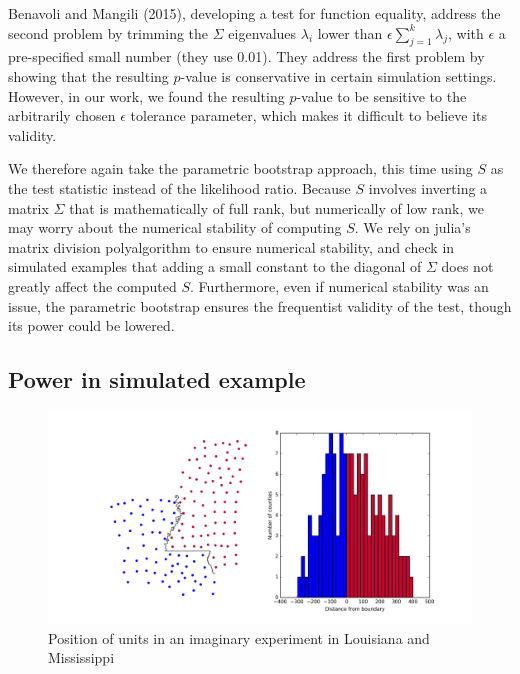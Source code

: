 \documentclass[letter]{article}
\makeatletter
\def\maxwidth{\ifdim\Gin@nat@width>\linewidth\linewidth
\else\Gin@nat@width\fi}
\let\Oldincludegraphics\includegraphics
\renewcommand{\includegraphics}[1]{\Oldincludegraphics[width=.8\maxwidth]{#1}}
\makeatother
\begin{document}
Benavoli and Mangili (2015), developing a test for function equality, address the second problem by trimming the \(\Sigma\) eigenvalues \(\lambda_i\) lower than \(\epsilon \sum_{j=1}^k \lambda_j\), with \(\epsilon\) a pre-specified small number (they use 0.01).
They address the first problem by showing that the resulting \(p\)-value is conservative in certain simulation settings.
However, in our work, we found the resulting \(p\)-value to be sensitive to the arbitrarily chosen \(\epsilon\) tolerance parameter, which makes it difficult to believe its validity.

We therefore again take the parametric bootstrap approach, this time using \(S\) as the test statistic instead of the likelihood ratio.
Because \(S\) involves inverting a matrix \(\Sigma\) that is mathematically of full rank, but numerically of low rank, we may worry about the numerical stability of computing \(S\).
We rely on julia's matrix division polyalgorithm to ensure numerical stability,
and check in simulated examples that adding a small constant to the diagonal of \(\Sigma\) does not greatly affect the computed \(S\).
Furthermore, even if numerical stability was an issue,
the parametric bootstrap ensures the frequentist validity of the test,
though its power could be lowered.
    


    	\subsection{Power in simulated example}\label{power-in-simulated-example}

\begin{figure}
\centering
\includegraphics{figures/mississippi_counties.png}
\caption{\label{fig:mississippi_counties} Position of units in an imaginary experiment in Louisiana and Mississippi}
\end{figure}
\end{document}
